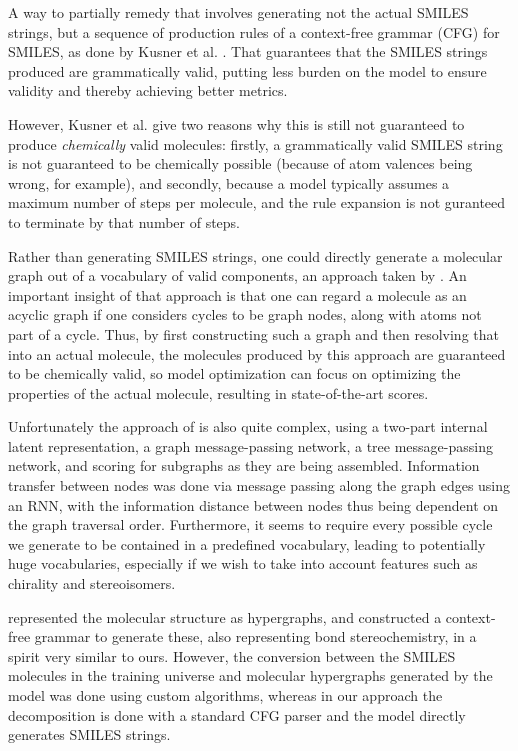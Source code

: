 \documentclass{article}
\begin{document}
A way to partially remedy that involves generating not the actual SMILES strings, but a sequence of production rules of a context-free grammar (CFG) for SMILES, as done by Kusner et al. . That guarantees that the SMILES strings produced are grammatically valid, putting less burden on the model to ensure validity and thereby achieving better metrics. 

However, Kusner et al.  give two reasons why this is still not guaranteed to produce \emph{chemically} valid molecules: firstly, a grammatically valid SMILES string is not guaranteed to be chemically possible (because of atom valences being wrong, for example), and secondly, because a model typically assumes a maximum number of steps per molecule, and the rule expansion is not guranteed to terminate by that number of steps. 

Rather than generating SMILES strings, one could directly generate a molecular graph out of a vocabulary of valid components, an approach taken by \cite{jin18}. An important insight of that approach is that one can regard a molecule as an acyclic graph if one considers cycles to be graph nodes, along with atoms not part of a cycle. Thus, by first constructing such a graph and then resolving that into an actual molecule, the molecules produced by this approach are guaranteed to be chemically valid, so model optimization can focus on optimizing the properties of the actual molecule, resulting in state-of-the-art scores.

Unfortunately the approach of \cite{jin18} is also quite complex, using a two-part internal latent representation, a graph message-passing network, a tree message-passing network, and scoring for subgraphs as they are being assembled.  Information transfer between nodes was done via message passing along the graph edges using an RNN, with the information distance between nodes thus being dependent on the graph traversal order. Furthermore, it seems to require every possible cycle we generate to be contained in a predefined vocabulary, leading to potentially huge vocabularies, especially if we wish to take into account features such as chirality and stereoisomers.

\cite{kajino18} represented the molecular structure as hypergraphs, and constructed a context-free grammar to generate these, also representing bond stereochemistry, in a spirit very similar to ours. However, the conversion between the SMILES molecules in the training universe and molecular hypergraphs generated by the model was done using custom algorithms, whereas in our approach the decomposition is done with a standard CFG parser and the model directly generates SMILES strings.
\end{document}
